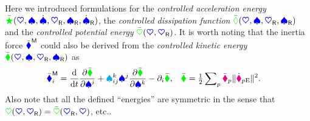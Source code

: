 Here we introduced formulations for the \textit{controlled acceleration energy} $\accEnergyC(\sysCoord, \sysVel, \sysVeld, \sysCoordR, \sysVelR, \sysVelRd)$, the \textit{controlled dissipation function} $\dissFktC(\sysCoord, \sysVel, \sysCoordR, \sysVelR)$ and the \textit{controlled potential energy} $\potentialEnergyC(\sysCoord, \sysCoordR)$.
It is worth noting that the inertia force $\genForceInertiaC$ could also be derived from the \textit{controlled kinetic energy} $\kineticEnergyC(\sysCoord, \sysVel, \sysCoordR, \sysVelR)$ as
\begin{align}
 \genForceInertiaCoeffC{\LidxI} &= \diff{t} \pdiff[\kineticEnergyC]{\sysVelCoeff{\LidxI}} + \BoltzSym{\LidxIII}{\LidxI}{\LidxII} \sysVelCoeff{\LidxII} \pdiff[\kineticEnergyC]{\sysVelCoeff{\LidxIII}} - \dirDiff{\LidxI} \kineticEnergyC,&
 \kineticEnergyC &= \tfrac{1}{2} \sumParticles \particleMassC{\PidxI} \norm{\particlePosEd{\PidxI}}^2.
\end{align}
Also note that all the defined ``energies'' are symmetric in the sense that $\potentialEnergy(\sysCoord, \sysCoordR) = \potentialEnergyC(\sysCoordR, \sysCoord)$, etc..

